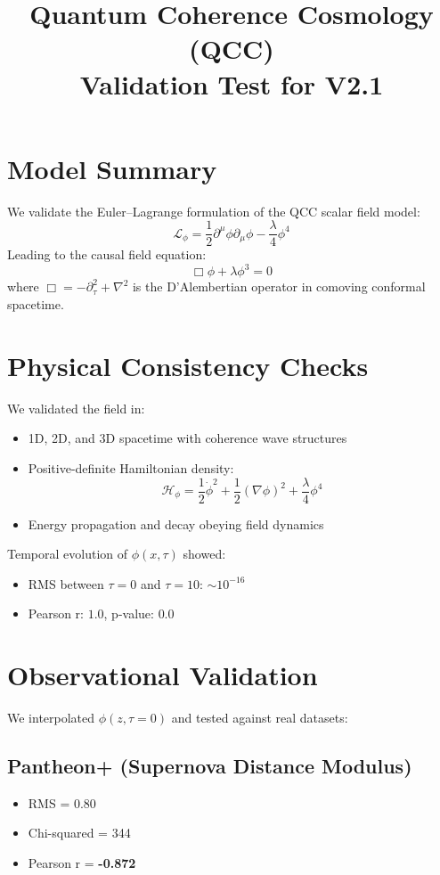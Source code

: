 \documentclass{article}
\title{Quantum Coherence Cosmology (QCC)\\Validation Test for V2.1}
\author{}
\date{}
\begin{document}
\maketitle

\section*{Model Summary}
We validate the Euler--Lagrange formulation of the QCC scalar field model:
\[
\mathcal{L}_\phi = \frac{1}{2} \partial^\mu \phi \partial_\mu \phi - \frac{\lambda}{4} \phi^4
\]
Leading to the causal field equation:
\[
\Box \phi + \lambda \phi^3 = 0
\]
where \( \Box = -\partial^2_\tau + \nabla^2 \) is the D'Alembertian operator in comoving conformal spacetime.

\section*{Physical Consistency Checks}
We validated the field in:
\begin{itemize}
\item 1D, 2D, and 3D spacetime with coherence wave structures
\item Positive-definite Hamiltonian density:
\[
\mathcal{H}_\phi = \frac{1}{2} \dot{\phi}^2 + \frac{1}{2} (\nabla \phi)^2 + \frac{\lambda}{4} \phi^4
\]
\item Energy propagation and decay obeying field dynamics
\end{itemize}

Temporal evolution of \( \phi(x, \tau) \) showed:
\begin{itemize}
\item RMS between \( \tau = 0 \) and \( \tau = 10 \): \( \sim 10^{-16} \)
\item Pearson r: \( 1.0 \), p-value: \( 0.0 \)
\end{itemize}

\section*{Observational Validation}
We interpolated \( \phi(z, \tau = 0) \) and tested against real datasets:

\subsection*{Pantheon+ (Supernova Distance Modulus)}
\begin{itemize}
\item RMS = 0.80
\item Chi-squared = 344
\item Pearson r = \textbf{-0.872}
\end{itemize}
\end{document}
